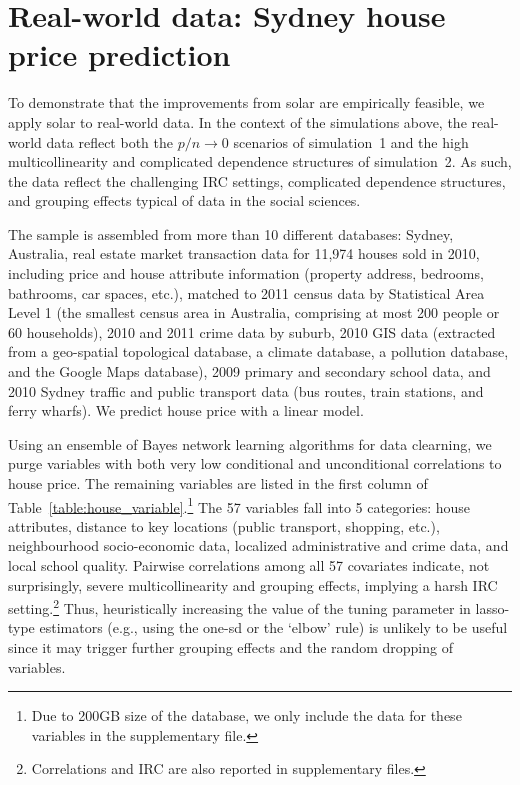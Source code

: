 \documentclass[12pt]{article}
\begin{document}
\section{Real-world data: Sydney house price prediction\label{section:application}}

To demonstrate that the improvements from solar are empirically feasible, we apply solar to real-world data. In the context of the simulations above, the real-world data reflect both the $p/n\rightarrow0$ scenarios of simulation~1 and the high multicollinearity and complicated dependence structures of simulation~2. As such, the data reflect the challenging IRC settings, complicated dependence structures, and grouping effects typical of data in the social sciences.

The sample is assembled from more than 10 different databases: Sydney, Australia, real estate market transaction data for 11,974 houses sold in 2010, including price and house attribute information (property address, bedrooms, bathrooms, car spaces, etc.), matched to 2011 census data by Statistical Area Level 1 (the smallest census area in Australia, comprising at most 200 people or 60 households), 2010 and 2011 crime data by suburb, 2010 GIS data (extracted from a geo-spatial topological database, a climate database, a pollution database, and the Google Maps database), 2009 primary and secondary school data, and 2010 Sydney traffic and public transport data (bus routes, train stations, and ferry wharfs). We predict house price with a linear model.

Using an ensemble of Bayes network learning algorithms for data clearning, we purge variables with both very low conditional and unconditional correlations to house price. The remaining variables are listed in the first column of Table~\ref{table:house_variable}.\footnote{Due to 200GB size of the database, we only include the data for these variables in the supplementary file.} The 57 variables fall into 5 categories: house attributes, distance to key locations (public transport, shopping, etc.), neighbourhood socio-economic data, localized administrative and crime data, and local school quality. Pairwise correlations among all 57 covariates indicate, not surprisingly, severe multicollinearity and grouping effects, implying a harsh IRC setting.\footnote{Correlations and IRC are also reported in supplementary files.} Thus, heuristically increasing the value of the tuning parameter in lasso-type estimators (e.g., using the one-sd or the `elbow' rule) is unlikely to be useful since it may trigger further grouping effects and the random dropping of variables.
\end{document}
